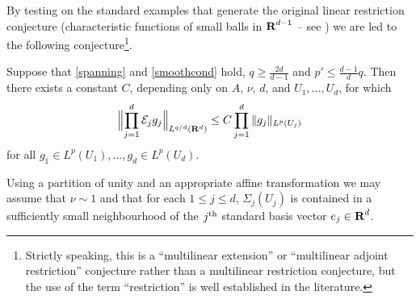 By testing on the standard examples that generate the
original linear restriction conjecture (characteristic functions of
small balls in ${\hbox{\bf R}}^{d-1}$ -- see \cite{St2}) we are led to the
following conjecture\footnote{Strictly speaking, this is a ``multilinear extension'' or ``multilinear
adjoint restriction'' conjecture rather than a multilinear restriction conjecture, but the use of the term ``restriction'' is
well established in the literature.}.
\begin{conjecture}\label{MLRC}
Suppose that \eqref{spanning} and \eqref{smoothcond} hold,
$q\geq\tfrac{2d}{d-1}$ and $p'\leq \tfrac{d-1}{d}q$. Then there
exists a constant $C$, depending only on $A$, $\nu$, $d$, and $U_1,\ldots,U_d$, for
which
\begin{equation}\label{mr}
\Bigl\|\prod_{j=1}^{d}{\mathcal{E}}_{j}g_{j}\Bigr\|_{L^{q/d}({\bf R}^d)}\leq
C\prod_{j=1}^{d} \|g_{j}\|_{L^{p}(U_{j})}
\end{equation}
for all $g_{1}\in L^p(U_1),\hdots,g_{d}\in L^{p}(U_d)$.
\end{conjecture}
\begin{remark}\label{scaling}
Using a partition of unity and an appropriate affine
transformation we may assume that $\nu\sim 1$ and that for each
$1\leq j\leq d$, $\Sigma_{j}(U_{j})$ is contained in a
sufficiently small neighbourhood of the $j^{\operatorname{th}}$ standard basis
vector $e_{j}\in{\hbox{\bf R}}^d$.
\end{remark}

